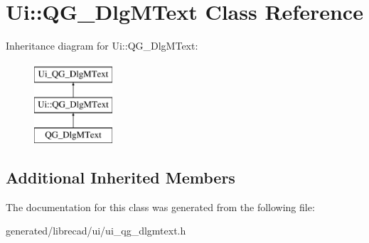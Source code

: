 \hypertarget{classUi_1_1QG__DlgMText}{\section{Ui\-:\-:Q\-G\-\_\-\-Dlg\-M\-Text Class Reference}
\label{classUi_1_1QG__DlgMText}
}
Inheritance diagram for Ui\-:\-:Q\-G\-\_\-\-Dlg\-M\-Text\-:\begin{figure}[H]
\begin{center}
\leavevmode
\includegraphics[height=3.000000cm]{classUi_1_1QG__DlgMText}
\end{center}
\end{figure}
\subsection*{Additional Inherited Members}


The documentation for this class was generated from the following file\-:\begin{DoxyCompactItemize}
\item 
generated/librecad/ui/ui\-\_\-qg\-\_\-dlgmtext.\-h\end{DoxyCompactItemize}
